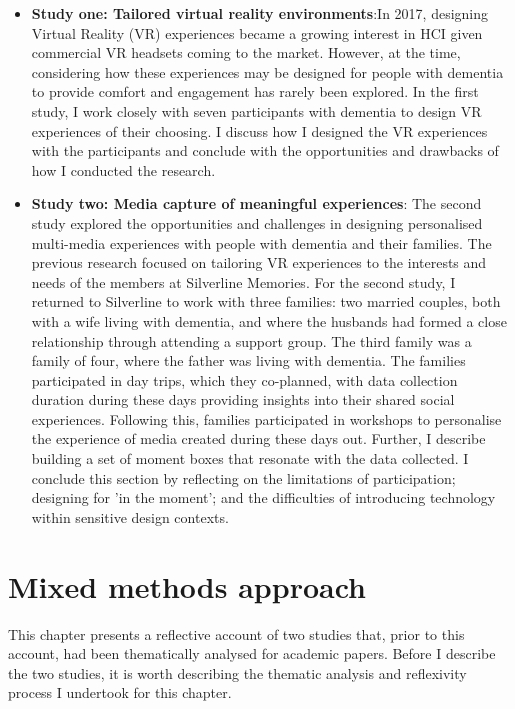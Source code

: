 \begin{itemize}
    \item  \textbf{Study one: Tailored virtual reality environments}:In 2017, designing Virtual Reality (VR) experiences became a growing interest in HCI given commercial VR headsets coming to the market. However, at the time, considering how these experiences may be designed for people with dementia to provide comfort and engagement has rarely been explored. In the first study, I work closely with seven participants with dementia to design VR experiences of their choosing. I discuss how I designed the VR experiences with the participants and conclude with the opportunities and drawbacks of how I conducted the research.

    \item \textbf{Study two: Media capture of meaningful experiences}: The second study explored the opportunities and challenges in designing personalised multi-media experiences with people with dementia and their families. The previous research focused on tailoring VR experiences to the interests and needs of the members at Silverline Memories. For the second study, I returned to Silverline to work with three families: two married couples, both with a wife living with dementia, and where the husbands had formed a close relationship through attending a support group. The third family was a family of four, where the father was living with dementia. The families participated in day trips, which they co-planned, with data collection duration during these days providing insights into their shared social experiences. Following this, families participated in workshops to personalise the experience of media created during these days out. Further, I describe building a set of moment boxes that resonate with the data collected. I conclude this section by reflecting on the limitations of participation; designing for 'in the moment'; and the difficulties of introducing technology within sensitive design contexts.
\end{itemize}

\section{Mixed methods approach}
\label{mixed-methods}
This chapter presents a reflective account of two studies that, prior to this account, had been thematically analysed for academic papers. Before I describe the two studies, it is worth describing the thematic analysis and reflexivity process I undertook for this chapter.

